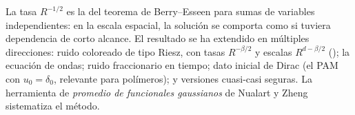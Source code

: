 \begin{observacion}
La tasa $R^{-1/2}$ es la del teorema de Berry--Esseen para sumas de variables
independientes: en la escala espacial, la solución se comporta como si tuviera dependencia
de corto alcance. El resultado se ha extendido en múltiples direcciones: ruido coloreado de
tipo Riesz, con tasas $R^{-\beta/2}$ y escalas $R^{d-\beta/2}$ (\cite{HuangNualartViitasaariZheng20}); la ecuación de ondas; ruido fraccionario
en tiempo; dato inicial de Dirac (el PAM con $u_0=\delta_0$, relevante para polímeros); y versiones
cuasi-casi seguras. La herramienta de \emph{promedio de funcionales gaussianos} de Nualart y Zheng
\cite{NualartZheng20} sistematiza el método.
\end{observacion}
